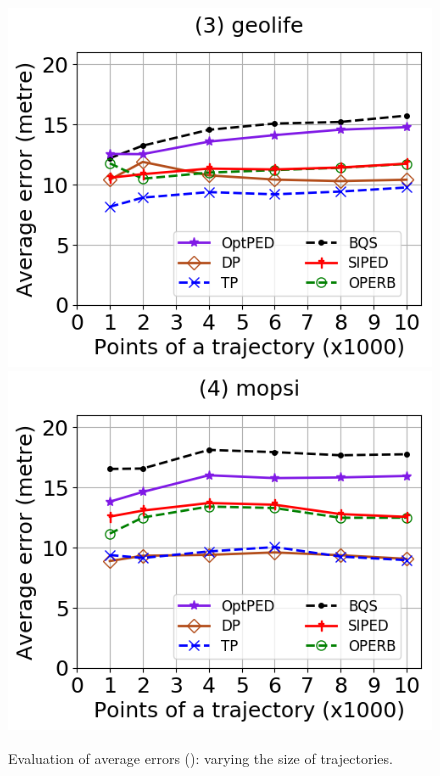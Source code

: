 \begin{figure}[tb!]
	\includegraphics[scale=0.315]{Figures/Exp-PED-error-size-geolife.png}	\hspace{1ex}
	\includegraphics[scale=0.315]{Figures/Exp-PED-error-size-mopsi.png}		
	\vspace{-2.5ex}
	\caption{\small Evaluation of average errors (\ped): varying the size of
    trajectories.}
  \label{fig:ae-ped-size}
	\vspace{-2ex}
\end{figure}

